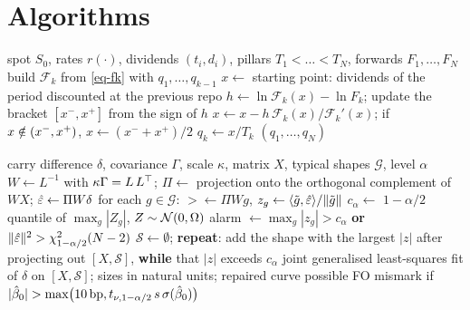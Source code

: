 \section{Algorithms}\label{app-algos}
\begin{algorithm}[H]
\caption{Implied repo bootstrap}\label{alg-bootstrap}
\begin{algorithmic}[1]
\Require spot $S_0$, rates $r(\cdot)$, dividends $(t_i, d_i)$, pillars $T_1<\dots<T_N$, forwards $F_1, \dots, F_N$
  \State build $\mathcal F_k$ from \eqref{eq-fk} with $q_1, \dots, q_{k-1}$
  \State $x\gets$ starting point: dividends of the period discounted at the previous repo
  \Repeat
    \State $h\gets\ln\mathcal F_k(x)-\ln F_k$; update the bracket $[x^-, x^+]$ from the sign of $h$
    \State $x\gets x-h\,\mathcal F_k(x)/\mathcal F_k'(x)$; if $x\notin\mathopen{(}x^-, x^+\mathclose{)}$, $x\gets(x^-+x^+)/2$
  \State $q_k\gets x/T_k$
\EndFor
\State \Return $(q_1, \dots, q_N)$
\end{algorithmic}
\end{algorithm}

\begin{algorithm}[H]
\caption{Structural detection}\label{alg-detect}
\begin{algorithmic}[1]
\Require carry difference $\delta$, covariance $\Gamma$, scale $\kappa$, matrix $X$, typical shapes $\mathcal G$, level $\alpha$
\State $W\gets L^{-1}$ with $\kappa\Gamma=L\,{L}^{\top}$; $\Pi\gets$ projection onto the orthogonal complement of $WX$; $\hat\varepsilon\gets\Pi W\delta$
\State for each $g\in\mathcal G$: $\gt\gets\Pi Wg$, $z_g\gets\langle \tilde g, \hat\varepsilon\rangle/\lVert \tilde g\rVert$
\State $c_\alpha\gets$ $1-\alpha/2$ quantile of $\max_g|Z_g|$, $Z\sim\mathcal{N}(0, \Omega)$ 
\State alarm $\gets\max_g|z_g|>c_\alpha$ \textbf{or} $\lVert \hat\varepsilon\rVert^2>\chi^2_{1-\alpha/2}(N-2)$
  \State $\mathcal S\gets\emptyset$; \textbf{repeat}: add the shape with the largest $|z|$ after projecting out
  $[X, \mathcal S]$,
  \Statex \hspace{\algorithmicindent} \textbf{while} that $|z|$ exceeds $c_\alpha$
\EndIf
\State joint generalised least-squares fit of $\delta$ on $[X, \mathcal S]$; sizes in natural units; repaired curve
\State possible FO mismark if $|\hat\beta_0|>\max\bigl(10\text{\,bp}, t_{\nu,1-\alpha/2}\,s\,\sigma(\hat\beta_0)\bigr)$
\end{algorithmic}
\end{algorithm}


